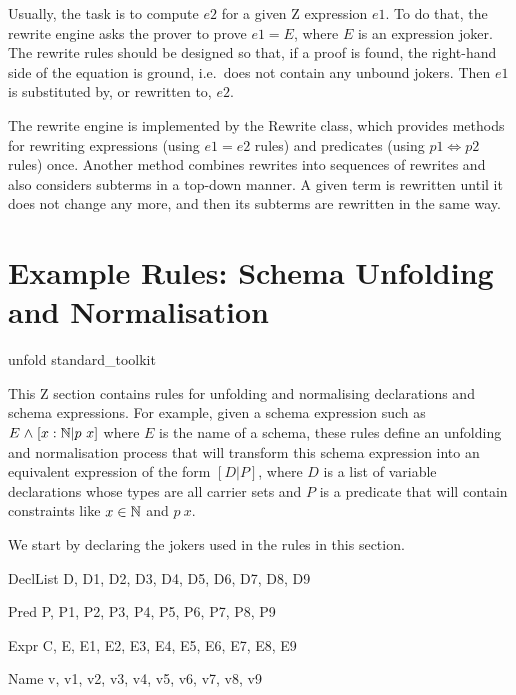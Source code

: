 \documentclass{entcs}
\begin{document}
Usually, the task is to compute $e2$ for a given Z expression $e1$.
To do that, the rewrite engine asks the prover to prove $e1 = E$,
where $E$ is an expression joker.  The rewrite rules should be
designed so that, if a proof is found, the right-hand side of the
equation is ground, i.e.\ does not contain any unbound jokers.  Then
$e1$ is substituted by, or rewritten to, $e2$.

The rewrite engine is implemented by the Rewrite class, which provides
methods for rewriting expressions (using $e1 = e2$ rules) and
predicates (using $p1 \iff p2$ rules) once.  Another method combines
rewrites into sequences of rewrites and also considers subterms in a
top-down manner.  A given term is rewritten until it does not change
any more, and then its subterms are rewritten in the same way.

\section{Example Rules: Schema Unfolding and Normalisation} \label{sec:schemas}

\begin{zsection}
  \SECTION unfold \parents standard\_toolkit
\end{zsection}

This Z section contains rules for unfolding and normalising declarations
and schema expressions.  For example, given a schema expression such as $E
\mathrel{\mathstrut{\wedge}} [x:{\mathbb N} | p~x]$ where $E$ is the name of a schema, these rules define
an unfolding and normalisation process that will transform this schema
expression into an equivalent expression of the form $[D|P]$, where $D$ is
a list of variable declarations whose types are all carrier sets and $P$ is
a predicate that will contain constraints like $x \in {\mathbb N}$ and $p~x$.

We start by declaring the jokers used in the rules in this section.

\begin{zedjoker}{DeclList} D, D1, D2, D3, D4, D5, D6, D7, D8, D9 \end{zedjoker}
\begin{zedjoker}{Pred} P, P1, P2, P3, P4, P5, P6, P7, P8, P9 \end{zedjoker}
\begin{zedjoker}{Expr} C, E, E1, E2, E3, E4, E5, E6, E7, E8, E9 \end{zedjoker}
\begin{zedjoker}{Name} v, v1, v2, v3, v4, v5, v6, v7, v8, v9 \end{zedjoker}
\end{document}
